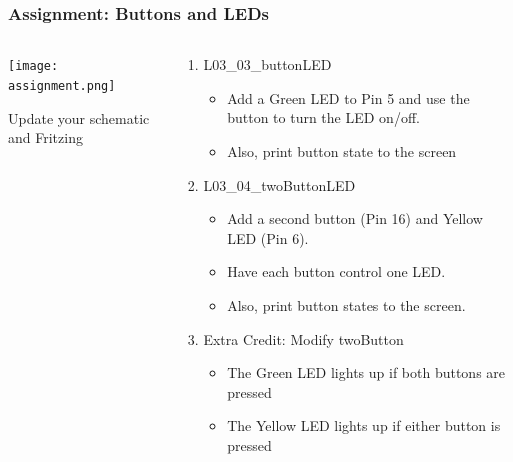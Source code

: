 \documentclass{beamer}
\begin{document}
\begin{frame}\frametitle{Assignment: Buttons and LEDs}
\begin{columns}
\begin{column}{3cm}
\begin{overprint}
\texttt{[image: assignment.png]}
\end{overprint}
Update your schematic and Fritzing
\end{column}
\begin{column}{7cm}
\begin{enumerate}
\item L03\_03\_buttonLED
\begin{itemize}
\item Add a Green LED to Pin 5 and use the button to turn the LED on/off.
\item Also, print button state to the screen
\end{itemize}
\item L03\_04\_twoButtonLED
\begin{itemize}
\item Add a second button (Pin 16) and Yellow LED (Pin 6).
\item Have each button control one LED.
\item Also, print button states to the screen.
\end{itemize}
\item Extra Credit: Modify twoButton
\begin{itemize}
\item The Green LED lights up if both buttons are pressed
\item The Yellow LED lights up if either button is pressed
\end{itemize}
\end{enumerate}
\end{column}
\end{columns}
\end{frame}
\end{document}
